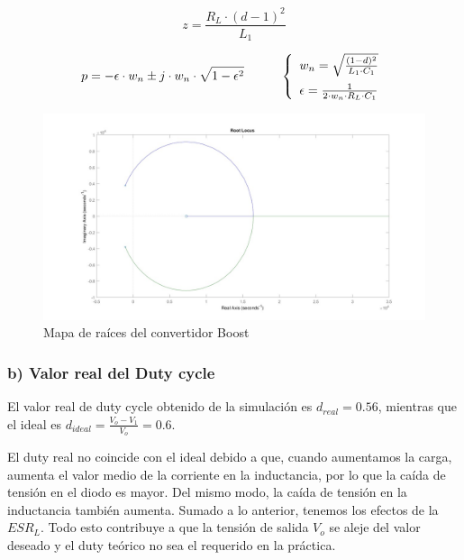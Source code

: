 \documentclass[e4_tp2_main.tex]{subfiles}
\begin{document}
\begin{equation}
z=\frac{R_L \cdot (d-1)^2}{L_1}
\end{equation}



\begin{equation}
p= - \epsilon \cdot w_n \pm j \cdot w_n \cdot \sqrt{1-{\epsilon}^2 } \hspace{1cm} \left\lbrace
\begin{array}{ll}
w_n=\sqrt{\frac{(1-d)^2}{L_1 \cdot C_1}} \vspace{0.2cm} \\
\epsilon= \frac{1}{2 \cdot w_n \cdot R_L \cdot C_1}
\end{array}
\right.
\end{equation}

  \begin{figure}[H]
  \centering
    \includegraphics[scale=0.2]{Imagenes/Punto1/rootlocus_Convertidor.jpeg}
    \caption{ Mapa de raíces del convertidor Boost}
  \end{figure}


\subsubsection*{b) Valor real del Duty cycle}

El valor real de duty cycle obtenido de la simulaci\'on es $d_{real}=0.56$, mientras que el ideal es $d_{ideal}= \frac{V_o-V_1}{V_o}=0.6$.


El duty real no coincide con el ideal debido a que, cuando aumentamos la carga, aumenta el valor medio de la corriente en la inductancia, por lo que la ca\'ida de tensi\'on en el diodo es mayor. Del mismo modo, la ca\'ida de tensi\'on en la inductancia tambi\'en aumenta. Sumado a lo anterior, tenemos los efectos de la $ESR_L$. Todo esto contribuye a que la tensi\'on de salida $V_o$ se aleje del valor deseado y el duty te\'orico no sea el requerido en la pr\'actica.
\end{document}
